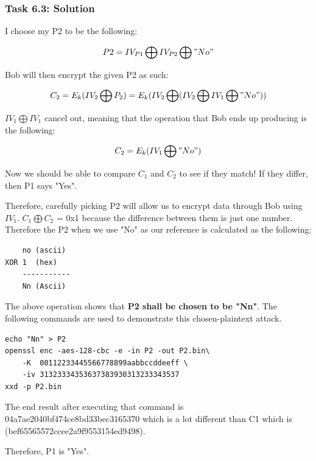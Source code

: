 \documentclass[12pt]{article}
\begin{document}
\clearpage
\subsubsection{Task 6.3: Solution}

I choose my P2 to be the following:

\[ P2 = IV_{P1} \bigoplus IV_{P2} \bigoplus "No" \]

Bob will then encrypt the given P2 as such:

\[ C_2 = E_{k} (IV_2 \bigoplus P_2 ) = E_{k} (IV_2\bigoplus (IV_2\bigoplus IV_1 \bigoplus "No")) \]

$IV_1 \bigoplus IV_1$ cancel out, meaning that the operation that Bob ends up producing is the following:

\[ C_2 = E_k (IV_1 \bigoplus "No") \]

Now we should be able to compare $C_1$ and $C_2$ to see if they match! If they differ, then P1 says "Yes".

Therefore, carefully picking P2 will allow us to encrypt data through Bob using $IV_1$. $C_1 \bigoplus C_2$ = 0x1 because the difference between them is just one number. Therefore the P2 when we use "No" as our reference is calculated as the following:

\begin{verbatim}
    no (ascii)
XOR 1  (hex)
    -----------
    Nn (Ascii)
\end{verbatim}

The above operation shows that \textbf{P2 shall be chosen to be "Nn"}. The following commands are used to demonstrate this chosen-plaintext attack.

\begin{verbatim}
echo "Nn" > P2
openssl enc -aes-128-cbc -e -in P2 -out P2.bin\
    -K  00112233445566778899aabbccddeeff \
    -iv 31323334353637383930313233343537
xxd -p P2.bin

\end{verbatim}

The end result after executing that command is 04a7ae2040bf474ce8bd33bec3165370 which is a lot different than C1 which is (bef65565572ccee2a9f9553154ed9498).

Therefore, P1 is "Yes".
\end{document}

